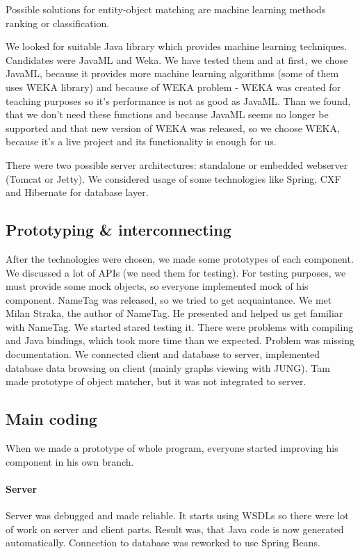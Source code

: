 Possible solutions for entity-object matching are machine learning  methods
ranking or classification.

We looked for suitable Java library which provides machine learning techniques.
Candidates were JavaML and Weka. We have tested them and at first, we chose
JavaML, because it provides more machine learning algorithms (some of them uses
WEKA library) and because of WEKA problem - WEKA  was created for teaching purposes so
it's performance is not as good as JavaML.
Than we found, that we don't need these functions and because JavaML seems no longer be supported and that
new version of WEKA was released, so we choose WEKA, because it's a live project and its functionality is enough for us.

There were two possible server architectures: standalone or embedded webserver
(Tomcat or Jetty). We considered usage of some technologies like Spring, CXF and
Hibernate for database layer.

\subsection{Prototyping \& interconnecting}
After the technologies were chosen, we made some prototypes of each component. We
discussed a lot of APIs (we need them for testing). For testing purposes, we must
provide some mock objects, so everyone implemented mock of his component.
NameTag was released, so we tried to get acquaintance. We met Milan Straka, the author of NameTag.
He presented and helped us get familiar with NameTag. We started stared testing it.
There were problems with compiling and Java bindings, which took more time than we expected. Problem was missing documentation.
We connected client and database to server, implemented database data browsing on client (mainly graphs viewing with JUNG).
Tam made prototype of object matcher, but it was not integrated to server.

\subsection{Main coding}
When we made a prototype of whole program, everyone started improving his component in his own branch.
\paragraph{Server} Server was debugged and made reliable. It starts using WSDLs so there were lot of work on server and client parts. Result was, that Java code is now generated automatically. Connection to database was reworked to use Spring Beans.
